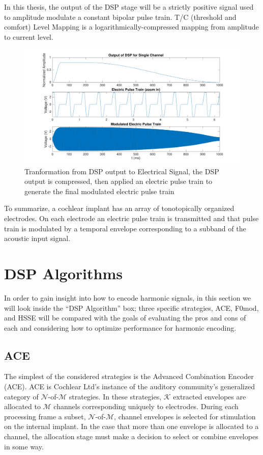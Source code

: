 \documentclass [11pt, proquest,oneside] {ganter_thesis}[2015/03/03]
\begin{document}
In this thesis, the output of the DSP stage will be a strictly positive signal used to amplitude modulate a constant bipolar pulse train.  T/C (threshold and comfort) Level Mapping is a logarithmically-compressed mapping from amplitude to current level.

\begin{figure}[!ht]
  \centering
    \includegraphics[width=1.0\textwidth]{matlab/output_of_dsp}   
    \caption{Tranformation from DSP output to Electrical Signal, the DSP output is compressed, then applied an electric pulse train to generate the final modulated electric pulse train}\label{fig:output_of_dsp}
\end{figure}

To summarize, a cochlear implant has an array of tonotopically organized electrodes.  On each electrode an electric pulse train is transmitted and that pulse train is modulated by a temporal envelope corresponding to a subband of the acoustic input signal.

\section{DSP Algorithms}

In order to gain insight into how to encode harmonic signals, in this section we will look inside the ``DSP Algorithm'' box; three specific strategies, ACE, F0mod, and HSSE will be compared with the goals of evaluating the pros and cons of each and considering how to optimize performance for harmonic encoding.

\subsection{ACE}\label{ss:ACE}

The simplest of the considered strategies is the Advanced Combination Encoder (ACE).  ACE is Cochlear Ltd's instance of the auditory community's generalized category of $\mathcal{N}$-of-$\mathcal{M}$ strategies.  In these strategies, $\mathcal{K}$ extracted envelopes are allocated to $\mathcal{M}$ channels corresponding uniquely to electrodes.  During each processing frame a subset, $\mathcal{N}$-of-$\mathcal{M}$, channel envelopes is selected for stimulation on the internal implant.  In the case that more than one envelope is allocated to a channel, the allocation stage must make a decision to select or combine envelopes in some way.
\end{document}
